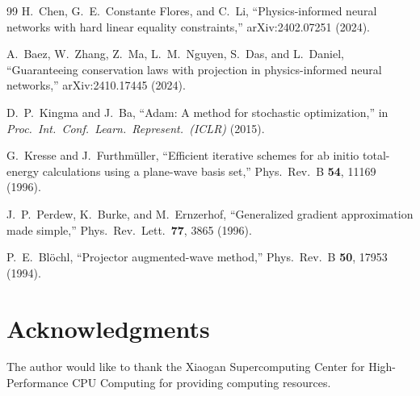 \documentclass[twoside,prb,aps,floatfix,superscriptaddress,longbibliography]{revtex4-2}
\begin{document}
\begin{thebibliography}{99}
H.~Chen, G.~E.~Constante Flores, and C.~Li, ``Physics-informed neural networks with hard linear equality constraints,'' arXiv:2402.07251 (2024).

A.~Baez, W.~Zhang, Z.~Ma, L.~M.~Nguyen, S.~Das, and L.~Daniel, ``Guaranteeing conservation laws with projection in physics-informed neural networks,'' arXiv:2410.17445 (2024).

D.~P.~Kingma and J.~Ba, ``Adam: A method for stochastic optimization,'' in \textit{Proc.\ Int.\ Conf.\ Learn.\ Represent.\ (ICLR)} (2015).

G.~Kresse and J.~Furthm\"{u}ller, ``Efficient iterative schemes for ab initio total-energy calculations using a plane-wave basis set,'' Phys.\ Rev.\ B \textbf{54}, 11169 (1996).

J.~P.~Perdew, K.~Burke, and M.~Ernzerhof, ``Generalized gradient approximation made simple,'' Phys.\ Rev.\ Lett.\ \textbf{77}, 3865 (1996).

P.~E.~Bl\"{o}chl, ``Projector augmented-wave method,'' Phys.\ Rev.\ B \textbf{50}, 17953 (1994).

\end{thebibliography}

\section*{Acknowledgments}
The author would like to thank the Xiaogan Supercomputing Center for High-Performance CPU Computing for providing computing resources.
\end{document}
